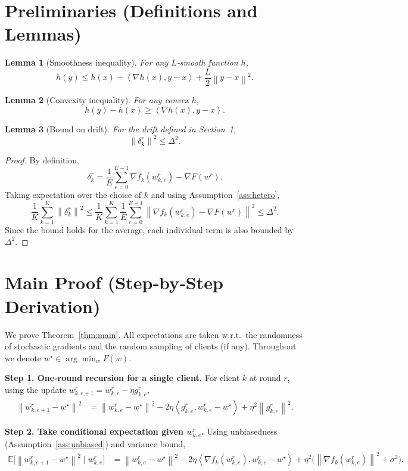 \documentclass{article}
\newtheorem{lemma}{Lemma}
\newcommand{\E}{\mathbb{E}}
\newcommand{\norm}[1]{\left\lVert#1\right\rVert}
\newcommand{\ip}[2]{\left\langle #1,#2\right\rangle}
\begin{document}
\newpage

\section*{Preliminaries (Definitions and Lemmas)}
\begin{lemma}[Smoothness inequality]\label{lem:smooth}
For any $L$‑smooth function $h$,
\[
    h(y)\le h(x)+\ip{\nabla h(x)}{y-x}+\frac{L}{2}\norm{y-x}^{2}.
\]
\end{lemma}
\begin{lemma}[Convexity inequality]\label{lem:convex}
For any convex $h$,
\[
    h(y)-h(x)\ge \ip{\nabla h(x)}{y-x}.
\]
\end{lemma}
\begin{lemma}[Bound on drift]\label{lem:drift}
For the drift defined in Section~1,
\[
    \norm{\delta_{k}^{r}}^{2}\le \Delta^{2}.
\]
\end{lemma}
\begin{proof}
By definition,
\[
\delta_{k}^{r}= \frac1E\sum_{e=0}^{E-1}\nabla f_k(w_{k,e}^{r})-\nabla F(w^{r}).
\]
Taking expectation over the choice of $k$ and using Assumption~\ref{ass:hetero},
\[
\frac1K\sum_{k=1}^{K}\norm{\delta_{k}^{r}}^{2}
\le \frac1K\sum_{k=1}^{K}\frac1E\sum_{e=0}^{E-1}
    \norm{\nabla f_k(w_{k,e}^{r})-\nabla F(w^{r})}^{2}
\le \Delta^{2}.
\]
Since the bound holds for the average, each individual term is also bounded by $\Delta^{2}$. \qedhere
\end{proof}

\section*{Main Proof (Step‑by‑Step Derivation)}
We prove Theorem~\ref{thm:main}.  All expectations are taken w.r.t.\ the randomness of stochastic gradients and the random sampling of clients (if any).  Throughout we denote $w^{\star}\in\arg\min_{w}F(w)$.

\bigskip

\noindent\textbf{Step 1.  One‑round recursion for a single client.}  
For client $k$ at round $r$, using the update $w_{k,e+1}^{r}=w_{k,e}^{r}-\eta g_{k,e}^{r}$,
\[
\begin{aligned}
    \norm{w_{k,e+1}^{r}-w^{\star}}^{2}
    &=\norm{w_{k,e}^{r}-w^{\star}}^{2}
      -2\eta\ip{g_{k,e}^{r}}{w_{k,e}^{r}-w^{\star}}
      +\eta^{2}\norm{g_{k,e}^{r}}^{2}. \tag{Step 1}
\end{aligned}
\]

\noindent\textbf{Step 2.  Take conditional expectation given $w_{k,e}^{r}$.}  
Using unbiasedness (Assumption~\ref{ass:unbiased}) and variance bound,
\[
\begin{aligned}
    \E\!\big[\norm{w_{k,e+1}^{r}-w^{\star}}^{2}\mid w_{k,e}^{r}\big]
    &=
    \norm{w_{k,e}^{r}-w^{\star}}^{2}
    -2\eta\ip{\nabla f_k(w_{k,e}^{r})}{w_{k,e}^{r}-w^{\star}}
    +\eta^{2}\Big(\norm{\nabla f_k(w_{k,e}^{r})}^{2}+\sigma^{2}\Big). \tag{Step 2}
\end{aligned}
\]
\end{document}
